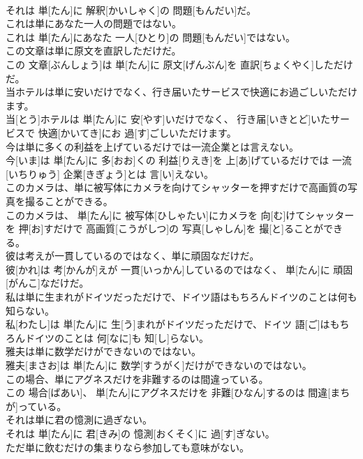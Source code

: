\documentclass[8pt]{extreport}
\begin{document}
\begin{CJK}{UTF8}{min}
\\	それは 単[たん]に 解釈[かいしゃく]の 問題[もんだい]だ。
\\	これは単にあなた一人の問題ではない。	
\\	これは 単[たん]にあなた 一人[ひとり]の 問題[もんだい]ではない。
\\	この文章は単に原文を直訳しただけだ。	
\\	この 文章[ぶんしょう]は 単[たん]に 原文[げんぶん]を 直訳[ちょくやく]しただけだ。
\\	当ホテルは単に安いだけでなく、行き届いたサービスで快適にお過ごしいただけます。	
\\	当[とう]ホテルは 単[たん]に 安[やす]いだけでなく、 行き届[いきとど]いたサービスで 快適[かいてき]にお 過[す]ごしいただけます。
\\	今は単に多くの利益を上げているだけでは一流企業とは言えない。	
\\	今[いま]は 単[たん]に 多[おお]くの 利益[りえき]を 上[あ]げているだけでは 一流[いちりゅう] 企業[きぎょう]とは 言[い]えない。
\\	このカメラは、単に被写体にカメラを向けてシャッターを押すだけで高画質の写真を撮ることができる。	
\\	このカメラは、 単[たん]に 被写体[ひしゃたい]にカメラを 向[む]けてシャッターを 押[お]すだけで 高画質[こうがしつ]の 写真[しゃしん]を 撮[と]ることができる。
\\	彼は考えが一貫しているのではなく、単に頑固なだけだ。	
\\	彼[かれ]は 考[かんが]えが 一貫[いっかん]しているのではなく、 単[たん]に 頑固[がんこ]なだけだ。
\\	私は単に生まれがドイツだっただけで、ドイツ語はもちろんドイツのことは何も知らない。	
\\	私[わたし]は 単[たん]に 生[う]まれがドイツだっただけで、ドイツ 語[ご]はもちろんドイツのことは 何[なに]も 知[し]らない。
\\	雅夫は単に数学だけができないのではない。	
\\	雅夫[まさお]は 単[たん]に 数学[すうがく]だけができないのではない。
\\	この場合、単にアグネスだけを非難するのは間違っている。	
\\	この 場合[ばあい]、 単[たん]にアグネスだけを 非難[ひなん]するのは 間違[まちが]っている。
\\	それは単に君の憶測に過ぎない。	
\\	それは 単[たん]に 君[きみ]の 憶測[おくそく]に 過[す]ぎない。
\\	ただ単に飲むだけの集まりなら参加しても意味がない。	

\end{CJK}
\end{document}
